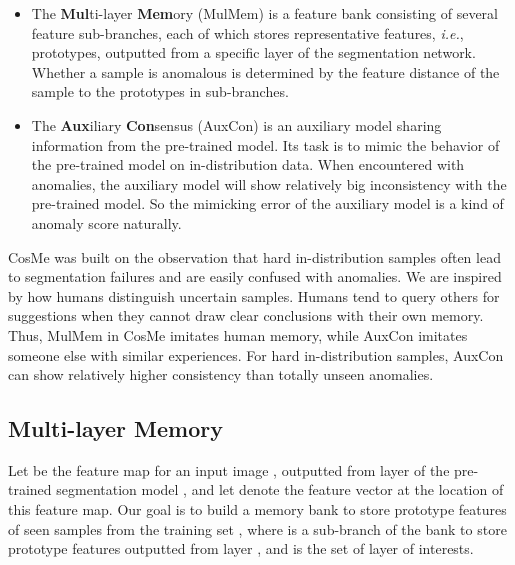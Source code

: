 \documentclass[10pt,twocolumn,letterpaper]{article}
\begin{document}
\begin{itemize}

    \item The \textbf{Mul}ti-layer \textbf{Mem}ory (MulMem) is a feature bank consisting of several feature sub-branches, each of which stores representative features, \emph{i.e.}, prototypes, outputted from a specific layer of the segmentation network. Whether a sample is anomalous is determined by the feature distance of the sample to the prototypes in sub-branches.

    \item The \textbf{Aux}iliary \textbf{Con}sensus (AuxCon) is an auxiliary model sharing information from the pre-trained model. Its task is to mimic the behavior of the pre-trained model on in-distribution data. When encountered with anomalies, the auxiliary model will show relatively big inconsistency with the pre-trained model. So the mimicking error of the auxiliary model is a kind of anomaly score naturally.


\end{itemize}

CosMe was built on the observation that hard in-distribution samples often lead to segmentation failures and are easily confused with anomalies. We are inspired by how humans distinguish uncertain samples. Humans tend to query others for suggestions when they cannot draw clear conclusions with their own memory. Thus, MulMem in CosMe imitates human memory, while AuxCon imitates someone else with similar experiences. For hard in-distribution samples, AuxCon can show relatively higher consistency than totally unseen anomalies.





\subsection{Multi-layer Memory}
\label{sec:pm}
Let  be the feature map for an input image , outputted from layer  of the pre-trained segmentation model , and let  denote the feature vector at the location  of this feature map. Our goal is to build a memory bank  to store prototype features of seen samples from the training set , where  is a sub-branch of the bank to store prototype features outputted from layer , and  is the set of layer of interests.
\end{document}
